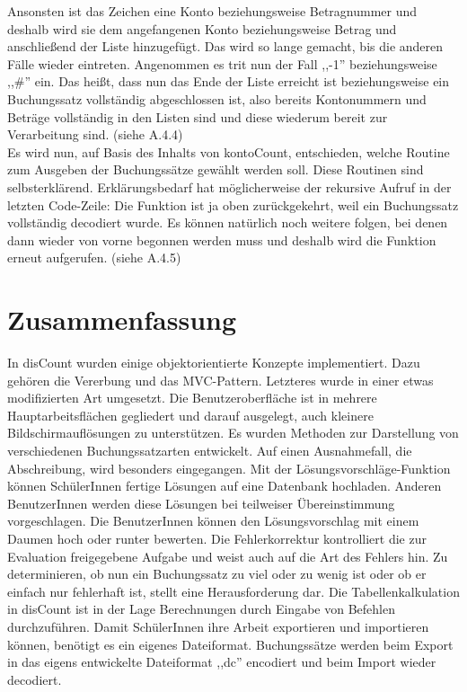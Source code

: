 \documentclass[12pt]{report}
\begin{document}
\noindent Ansonsten ist das Zeichen eine Konto beziehungsweise Betragnummer und deshalb wird sie dem angefangenen Konto beziehungsweise Betrag und anschließend der Liste hinzugefügt. Das wird so lange gemacht, bis die anderen Fälle wieder eintreten. Angenommen es trit nun der Fall ,,-1'' beziehungsweise ,,\#'' ein. Das heißt, dass nun das Ende der Liste erreicht ist beziehungsweise ein Buchungssatz vollständig abgeschlossen ist, also bereits Kontonummern und Beträge vollständig in den Listen sind und diese wiederum bereit zur Verarbeitung sind. (siehe A.4.4)\\



\noindent Es wird nun, auf Basis des Inhalts von kontoCount, entschieden, welche Routine zum Ausgeben der Buchungssätze gewählt werden soll. Diese Routinen sind selbsterklärend. Erklärungsbedarf hat möglicherweise der rekursive Aufruf in der letzten Code-Zeile: Die Funktion ist ja oben zurückgekehrt, weil ein Buchungssatz vollständig decodiert wurde. Es können natürlich noch weitere folgen, bei denen dann wieder von vorne begonnen werden muss und deshalb wird die Funktion erneut aufgerufen. (siehe A.4.5)
\newpage




\section*{Zusammenfassung} 
\rhead{}
 
In disCount wurden einige objektorientierte Konzepte implementiert. Dazu gehören die Vererbung und das MVC-Pattern. Letzteres wurde in einer etwas modifizierten Art umgesetzt. Die Benutzeroberfläche ist in mehrere Hauptarbeitsflächen gegliedert und darauf ausgelegt, auch kleinere Bildschirmauflösungen zu unterstützen. Es wurden Methoden zur Darstellung von verschiedenen Buchungssatzarten entwickelt. Auf einen Ausnahmefall, die Abschreibung, wird besonders eingegangen. Mit der Lösungsvorschläge-Funktion können SchülerInnen fertige Lösungen auf eine Datenbank hochladen. Anderen BenutzerInnen werden diese Lösungen bei teilweiser Übereinstimmung vorgeschlagen. Die BenutzerInnen können den Lösungsvorschlag mit einem Daumen hoch oder runter bewerten. Die Fehlerkorrektur kontrolliert die zur Evaluation freigegebene Aufgabe und weist auch auf die Art des Fehlers hin. Zu determinieren, ob nun ein Buchungssatz zu viel oder zu wenig ist oder ob er einfach nur fehlerhaft ist, stellt eine Herausforderung dar. Die Tabellenkalkulation in disCount ist in der Lage Berechnungen durch Eingabe von Befehlen durchzuführen. Damit SchülerInnen ihre Arbeit exportieren und importieren können, benötigt es ein eigenes Dateiformat. Buchungssätze werden beim Export in das eigens entwickelte Dateiformat ,,dc'' encodiert und beim Import wieder decodiert.
\end{document}
